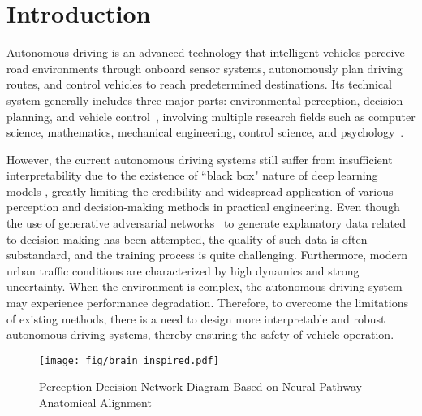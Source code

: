 \section{Introduction}
\label{sec:intro}
\hspace{1pc}Autonomous driving \cite{urmson2008autonomous} is an advanced technology that intelligent vehicles perceive road environments through onboard sensor systems, autonomously plan driving routes, and control vehicles to reach predetermined destinations. 
Its technical system generally includes three major parts: environmental perception, decision planning, and vehicle control~\cite{amini2020learning, montemerlo2008junior}, involving multiple research fields such as computer science, mathematics, mechanical engineering, control science, and psychology~\cite{chen2015deepdriving}.


However, the current autonomous driving systems still suffer from insufficient interpretability due to the existence of ``black box" nature of deep learning models \cite{7979332}, greatly limiting the credibility and widespread application of various perception and decision-making methods in practical engineering. 
Even though the use of generative adversarial networks~\cite{zugner2020adversarial} to generate explanatory data related to decision-making has been attempted, the quality of such data is often substandard, and the training process is quite challenging. 
Furthermore, modern urban traffic conditions are characterized by high dynamics and strong uncertainty. 
When the environment is complex, the autonomous driving system may experience performance degradation. 
Therefore, to overcome the limitations of existing methods, there is a need to design more interpretable and robust autonomous driving systems, thereby ensuring the safety of vehicle operation.
\begin{figure}[t]
	\centering
	\texttt{[image: fig/brain\_inspired.pdf]}
	\caption{Perception-Decision Network Diagram Based on Neural Pathway Anatomical Alignment}
	\label{fig:fig1}
\end{figure}

